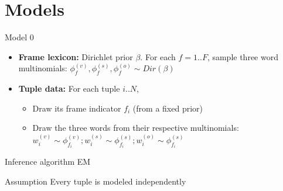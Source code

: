 \documentclass[xcolor=svgnames,handout]{beamer}
\begin{document}
\section{Models}
\begin{frame}{Model 0}
	\begin{itemize}
		\item \textbf{Frame lexicon:} Dirichlet prior $\beta$. For each $f = 1..F$, sample three word multinomials: $\phi_f^{(v)}, \phi_f^{(s)}, \phi_f^{(o)} \sim  Dir(\beta)$
		\item \textbf{Tuple data:} For each tuple $i..N$,
		\begin{itemize}
			\item Draw its frame indicator $f_i$ (from a fixed prior)
			\item Draw the three words from their respective multinomials: $w_i^{(v)} \sim \phi_{f_i}^{(v)}; w_i^{(s)} \sim \phi_{f_i}^{(s)}; w_i^{(o)} \sim \phi_{f_i}^{(s)}$
		\end{itemize}
	\end{itemize}
	\begin{block}{Inference algorithm}
		EM
	\end{block}
	\begin{alertblock}{Assumption}
		Every tuple is modeled independently
	\end{alertblock}
\end{frame}
\end{document}
